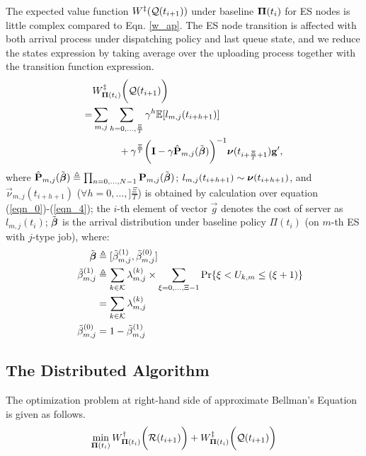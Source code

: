The expected value function $W^{\ddagger}(\mathcal{Q}(t_{i+1}))$ under baseline $\boldsymbol{\Pi}(t_{i})$ for ES nodes is little complex compared to Eqn. \ref{w_ap}.
The ES node transition is affected with both arrival process under dispatching policy and last queue state, and we reduce the states expression by taking average over the uploading process together with the transition function expression.
\begin{align}
    &W^{\ES}_{\BaseLine(t_i)}\Paren{\mathcal{Q}(t_{i+1})} %
    \nonumber\\
    =& \sum_{m,j}\sum_{h=0,\dots,\frac{\Xi}{T}} \gamma^{h} \mathbb{E}[ l_{m,j}(t_{i+h+1}) ]
    \nonumber\\
    &~~~~~~~~+ \gamma^{\frac{\Xi}{T}} \Paren{ \mat{I} - \gamma \hat{\mat{P}}_{m,j}(\tilde{\vecG{\beta}}) }^{-1} \vecG{\nu}(t_{i+\frac{\Xi}{T}+1}) \vec{g}',
\end{align}
where $\hat{\mathbf{P}}_{m,j}(\tilde{\boldsymbol{\beta}}) \triangleq \prod_{n=0,\dots,N-1} \mathbf{P}_{m,j}(\tilde{\boldsymbol{\beta}})$;
$l_{m,j}(t_{i+h+1}) \sim \boldsymbol{\nu}(t_{i+h+1})$, and $\vec{\nu}_{m,j}(t_{i+h+1})$ ($\forall h=0,\dots,]\frac{\Xi}{T}$) is obtained by calculation over equation (\ref{eqn_0})-(\ref{eqn_4});
the $i$-th element of vector $\vec{g}$ denotes the cost of server as $l_{m,j}(t_i)$;
$\tilde{\boldsymbol{\beta}}$ is the arrival distribution under baseline policy $\Pi(t_{i})$ (on $m$-th ES with $j$-type job), where:
\begin{align}
    ~~~~\tilde{\boldsymbol{\beta}} &\triangleq [\tilde{\beta}^{(1)}_{m,j}, \tilde{\beta}^{(0)}_{m,j}]
    \\
    ~~~~\tilde{\beta}^{(1)}_{m,j} &\triangleq \sum_{k\in\mathcal{K}} \lambda^{(k)}_{m,j} \times \sum_{\xi=0,\dots,\Xi-1} \Pr\{ \xi<U_{k,m}\leq(\xi+1) \}
        \nonumber\\
    ~~~~&= \sum_{k\in\mathcal{K}} \lambda^{(k)}_{m,j}
    \\
    ~~~~\tilde{\beta}^{(0)}_{m,j} &= 1 - \tilde{\beta}^{(1)}_{m,j}
\end{align}

\subsection{The Distributed Algorithm}
The optimization problem at right-hand side of approximate Bellman's Equation is given as follows.
\begin{align}
    \min_{\boldsymbol{\Pi}(t_i)} W^{\dagger}_{\boldsymbol{\Pi}(t_i)}\bigg(\mathcal{R}(t_{i+1})\bigg) + W^{\ddagger}_{\boldsymbol{\Pi}(t_i)}\bigg(\mathcal{Q}(t_{i+1})\bigg)
    \label{eqn_opt}
\end{align}


